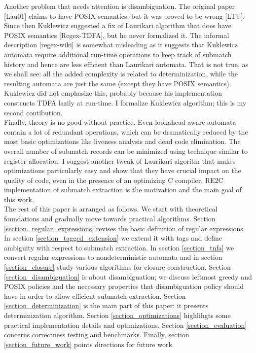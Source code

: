 \documentclass{article}
\theoremstyle{definition}
\begin{document}
\begin{multicols}{2}
Another problem that needs attention is disambiguation.
The original paper [Lau01] claims to have POSIX semantics, but it was proved to be wrong [LTU].
Since then Kuklewicz suggested a fix of Laurikari algorithm that does have POSIX semantics [Regex-TDFA], but he never formalized it.
The informal description [regex-wiki] is somewhat misleading as it suggests that Kuklewicz automata
require additional run-time operations to keep track of submatch history and hence are less efficient than Laurikari automata.
That is not true, as we shall see: all the added complexity is related to determinization,
while the resulting automata are just the same (except they have POSIX semantics).
Kuklewicz did not emphasize this, probably because his implementation constructs TDFA lazily at run-time.
I formalize Kuklewicz algorithm; this is my second contibution.
\\

Finally, theory is no good without practice.
Even lookahead-aware automata contain a lot of redundant operations,
which can be dramatically reduced by the most basic optimizations like liveness analysis and dead code elimination.
The overall number of submatch records can be minimized using technique similar to register allocation.
I suggest another tweak of Laurikari algoritm that makes optimizations particularly easy
and show that they have crucial impact on the quality of code, even in the presence of an optimizing C compiler.
RE2C implementation of submatch extraction is the motivation and the main goal of this work.
\\

The rest of this paper is arranged as follows.
We start with theoretical foundations and gradually move towards practical algorithms.
Section \ref{section_regular_expressions} revises the basic definition of regular expressions.
In section \ref{section_tagged_extension} we extend it with tags
and define ambiguity with respect to submatch extraction.
In section \ref{section_tnfa} we convert regular expressions to nondeterministic automata
and in section \ref{section_closure} study various algorithms for closure construction.
Section \ref{section_disambiguation} is about disambiguation;
we discuss leftmost greedy and POSIX policies and the necessary properties that disambiguation policy should have in order to allow efficient submatch extraction.
Section \ref{section_determinization} is the main part of this paper: it presents determinization algorithm.
Section \ref{section_optimizations} highlihgts some practical implementation details and optimizations.
Section \ref{section_evaluation} concerns correctness testing and benchmarks.
Finally, section \ref{section_future_work} points directions for future work.


\end{multicols}
\end{document}
